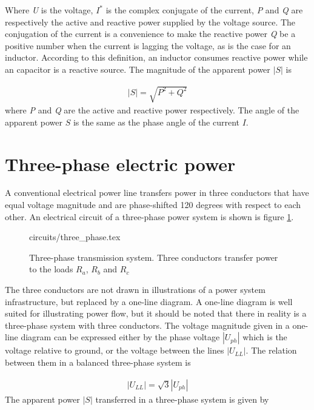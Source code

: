 \documentclass[class=book, crop=false]{standalone}
\begin{document}
Where \textit{U} is the voltage, $I^{*}$ is the complex conjugate of the current, \textit{P} and \textit{Q} are respectively  the active and reactive power supplied by the voltage source. The conjugation of the current is a convenience to make the reactive power \textit{Q} be a positive number when the current is lagging the voltage, as is the case for an inductor. According to this definition, an inductor consumes reactive power while an capacitor is a reactive source. The magnitude of the apparent power $|S|$ is

\begin{equation}
   \begin{aligned}\label{eq:theory:pythagoras_power}
|S| = \sqrt{P^{2} + Q^{2}}
\end{aligned} 
\end{equation}
where \textit{P} and \textit{Q} are the active and reactive power respectively. The angle of the apparent power $S$ is the same as the phase angle of the current $I$. 

\section{Three-phase electric power}
A conventional electrical power line transfers power in three conductors that have equal voltage magnitude and are phase-shifted 120 degrees with respect to each other. An electrical circuit of a three-phase power system is shown is figure \ref{fig:theory:three_phase}.

\begin{figure}[ht!]
    \center
    {circuits/three_phase.tex}
    \caption[size = 9]
    {Three-phase transmission system. Three conductors transfer power to the loads $R_{a}$, $R_{b}$ and $R_{c}$}\label{fig:theory:three_phase}
\end{figure}

The three conductors are not drawn in illustrations of a power system infrastructure, but replaced by a one-line diagram. A one-line diagram is well suited for illustrating power flow, but it should be noted that there in reality is a three-phase system with three conductors. The voltage magnitude given in a one-line diagram can be expressed either by the phase voltage $|U_{ph}|$ which is the voltage relative to ground, or the voltage between the lines $|U_{LL}|$. The relation between them in a balanced three-phase system is

\begin{equation}
   \begin{aligned}\label{eq:theory:three_phase_voltage}
|U_{LL}| = \sqrt{3} |U_{ph}|
\end{aligned} 
\end{equation}
The apparent power $|S|$ transferred in a three-phase system is given by
\end{document}
